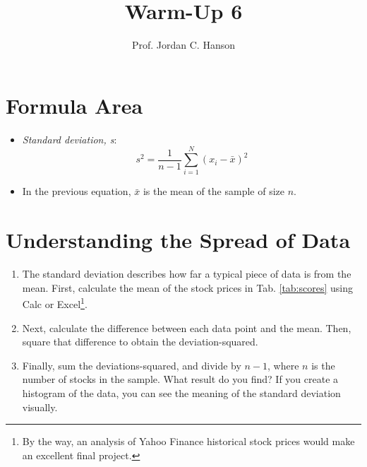 \documentclass{article}
\begin{document}
\title{Warm-Up 6}
\author{Prof. Jordan C. Hanson}

\maketitle

\section{Formula Area}

\begin{itemize}
\item \textit{Standard deviation, s}:
\begin{equation}
s^2 = \frac{1}{n-1}\sum_{i=1}^{N} (x_i - \bar{x})^2
\end{equation}
\item In the previous equation, $\bar{x}$ is the mean of the sample of size $n$.
\end{itemize}

\section{Understanding the Spread of Data}

\begin{enumerate}
\item The standard deviation describes how far a typical piece of data is from the mean.  First, calculate the mean of the stock prices in Tab. \ref{tab:scores} using Calc or Excel\footnote{By the way, an analysis of Yahoo Finance historical stock prices would make an excellent final project.}. \\ \vspace{1cm}
\item Next, calculate the difference between each data point and the mean.  Then, square that difference to obtain the deviation-squared. \\ \vspace{1cm}
\item Finally, sum the deviations-squared, and divide by $n-1$, where $n$ is the number of stocks in the sample.  What result do you find?  If you create a histogram of the data, you can see the meaning of the standard deviation visually.
\end{enumerate}
\end{document}
